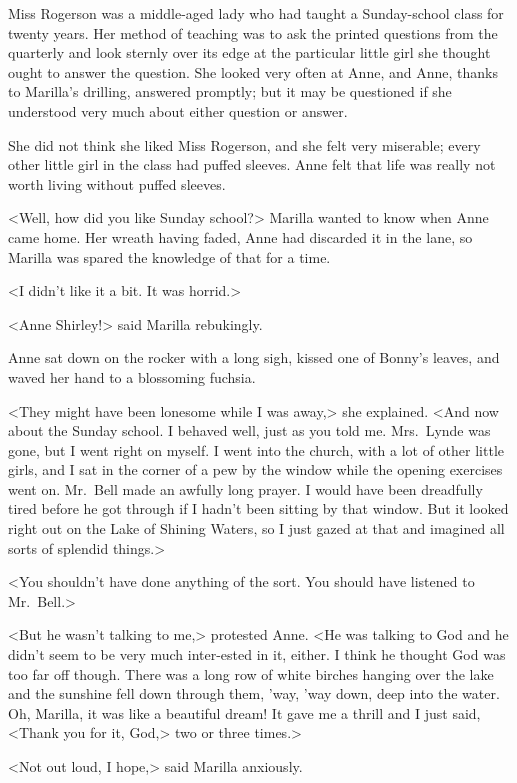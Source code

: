 Miss Rogerson was a middle-aged lady who had taught a Sunday-school class for twenty years. Her method of teaching was to ask the printed questions from the quarterly and look sternly over its edge at the particular little girl she thought ought to answer the question. She looked very often at Anne, and Anne, thanks to Marilla's drilling, answered promptly; but it may be questioned if she understood very much about either question or answer.

She did not think she liked Miss Rogerson, and she felt very miserable; every other little girl in the class had puffed sleeves. Anne felt that life was really not worth living without puffed sleeves.

<Well, how did you like Sunday school?> Marilla wanted to know when Anne came home. Her wreath having faded, Anne had discarded it in the lane, so Marilla was spared the knowledge of that for a time.

<I didn't like it a bit. It was horrid.>

<Anne Shirley!> said Marilla rebukingly.

Anne sat down on the rocker with a long sigh, kissed one of Bonny's leaves, and waved her hand to a blossoming fuchsia.

<They might have been lonesome while I was away,> she explained. <And now about the Sunday school. I behaved well, just as you told me. Mrs.~Lynde was gone, but I went right on myself. I went into the church, with a lot of other little girls, and I sat in the corner of a pew by the window while the opening exercises went on. Mr.~Bell made an awfully long prayer. I would have been dreadfully tired before he got through if I hadn't been sitting by that window. But it looked right out on the Lake of Shining Waters, so I just gazed at that and imagined all sorts of splendid things.>

<You shouldn't have done anything of the sort. You should have listened to Mr.~Bell.>

<But he wasn't talking to me,> protested Anne. <He was talking to God and he didn't seem to be very much inter-ested in it, either. I think he thought God was too far off though. There was a long row of white birches hanging over the lake and the sunshine fell down through them, 'way, 'way down, deep into the water. Oh, Marilla, it was like a beautiful dream! It gave me a thrill and I just said, <Thank you for it, God,> two or three times.>

<Not out loud, I hope,> said Marilla anxiously.

